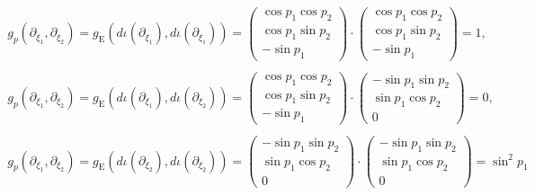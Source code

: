 \documentclass{ltjsarticle}
\begin{document}
\begin{gather*}
    \begin{split}
    g_p(\partial_{\xi_1}, \partial_{\xi_2})
    =
    g_\text{E}(d\iota(\partial_{\xi_1}), d\iota(\partial_{\xi_1}))
    =
    \begin{pmatrix}
        \cos p_1 \cos p_2 \\
        \cos p_1 \sin p_2 \\
        - \sin p_1
    \end{pmatrix}
    \cdot
    \begin{pmatrix}
        \cos p_1 \cos p_2 \\
        \cos p_1 \sin p_2 \\
        - \sin p_1
    \end{pmatrix}
    = 1,
    \end{split} \\
    \begin{split}
    g_p(\partial_{\xi_1}, \partial_{\xi_2})
    =
    g_\text{E}(d\iota (\partial_{\xi_1}), d\iota (\partial_{\xi_2}))
    =
    \begin{pmatrix}
        \cos p_1 \cos p_2 \\
        \cos p_1 \sin p_2 \\
        - \sin p_1
    \end{pmatrix}
    \cdot
    \begin{pmatrix}
        - \sin p_1 \sin p_2 \\
        \sin p_1 \cos p_2 \\
        0
    \end{pmatrix}
    = 0,
    \end{split} \\
    \begin{split}
    g_p(\partial_{\xi_1}, \partial_{\xi_2})
    = g_\text{E}(d\iota (\partial_{\xi_2}), d\iota (\partial_{\xi_2}))
    =
    \begin{pmatrix}
        - \sin p_1 \sin p_2 \\
        \sin p_1 \cos p_2 \\
        0
    \end{pmatrix}
    \cdot
    \begin{pmatrix}
        - \sin p_1 \sin p_2 \\
        \sin p_1 \cos p_2 \\
        0
    \end{pmatrix}
    = \sin^2 p_1
    \end{split}
\end{gather*}
\end{document}
